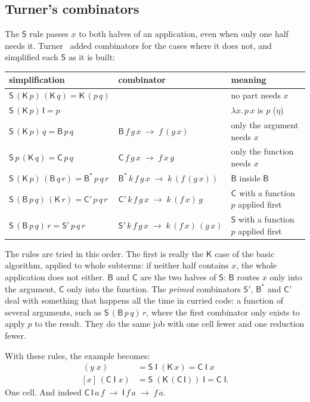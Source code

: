 \documentclass[11pt,a4paper]{article}
\newcommand{\cmb}[1]{\textsf{#1}}
\newcommand{\I}{\cmb{I}}
\newcommand{\K}{\cmb{K}}
\newcommand{\Sc}{\cmb{S}}
\newcommand{\B}{\cmb{B}}
\newcommand{\C}{\cmb{C}}
\newcommand{\Sp}{\cmb{S}'}
\newcommand{\Bs}{\cmb{B}^{*}}
\newcommand{\Cp}{\cmb{C}'}
\newcommand{\abs}[2]{[#1]\,#2}
\newcommand{\red}{\;\to\;}
\theoremstyle{definition}
\theoremstyle{plain}
\begin{document}
\subsection{Turner's combinators}\label{sec:turner}

The $\Sc$ rule passes $x$ to both halves of an application, even when only
one half needs it. Turner~\cite{turner79,turner79b} added combinators for the
cases where it does not, and simplified each $\Sc$ as it is built:

\begin{center}
\renewcommand{\arraystretch}{1.15}
\begin{tabular}{@{}l l l@{}}
\toprule
simplification & combinator & meaning\\
\midrule
$\Sc\,(\K\,p)\,(\K\,q) = \K\,(p\,q)$ & & no part needs $x$\\
$\Sc\,(\K\,p)\,\I = p$ & & $\lambda x.\,p\,x$ is $p$ ($\eta$)\\
$\Sc\,(\K\,p)\,q = \B\,p\,q$ & $\B\,f\,g\,x \red f\,(g\,x)$ & only the argument needs $x$\\
$\Sc\,p\,(\K\,q) = \C\,p\,q$ & $\C\,f\,g\,x \red f\,x\,g$ & only the function needs $x$\\
$\Sc\,(\K\,p)\,(\B\,q\,r) = \Bs\,p\,q\,r$ & $\Bs\,k\,f\,g\,x \red k\,(f\,(g\,x))$ & $\B$ inside $\B$\\
$\Sc\,(\B\,p\,q)\,(\K\,r) = \Cp\,p\,q\,r$ & $\Cp\,k\,f\,g\,x \red k\,(f\,x)\,g$ & $\C$ with a function $p$ applied first\\
$\Sc\,(\B\,p\,q)\,r = \Sp\,p\,q\,r$ & $\Sp\,k\,f\,g\,x \red k\,(f\,x)\,(g\,x)$ & $\Sc$ with a function $p$ applied first\\
\bottomrule
\end{tabular}
\end{center}

\noindent
The rules are tried in this order. The first is really the $\K$ case of the
basic algorithm, applied to whole subterms: if neither half contains $x$, the
whole application does not either. $\B$ and $\C$ are the two halves of $\Sc$:
$\B$ routes $x$ only into the argument, $\C$ only into the function. The
\emph{primed} combinators $\Sp$, $\Bs$ and $\Cp$ deal with something that
happens all the time in curried code: a function of several arguments, such
as $\Sc\,(\B\,p\,q)\,r$, where the first combinator only exists to apply $p$
to the result. They do the same job with one cell fewer and one reduction
fewer.

With these rules, the example becomes:
\begin{align*}
  \abs{y}{(y\;x)} &= \Sc\;\I\;(\K\,x) = \C\;\I\;x\\
  \abs{x}{(\C\;\I\;x)} &= \Sc\;(\K\,(\C\,\I))\;\I = \C\;\I.
\end{align*}
One cell. And indeed $\C\,\I\,a\,f \red \I\,f\,a \red f\,a$.
\end{document}
